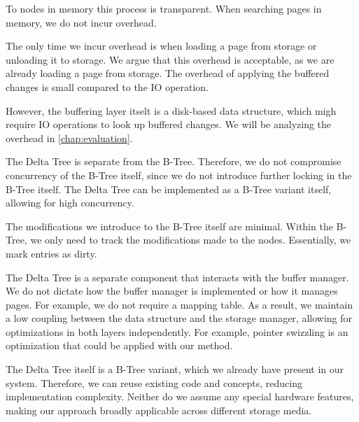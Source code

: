 To nodes in memory this process is transparent.
When searching pages in memory, we do not incur overhead.

The only time we incur overhead is when loading a page from storage or unloading it to storage.
We argue that this overhead is acceptable, as we are already loading a page from storage.
The overhead of applying the buffered changes is small compared to the \ac{IO} operation.

However, the buffering layer itselt is a disk-based data structure, which migh require \ac{IO} operations to look up buffered changes.
We will be analyzing the overhead in \autoref{chap:evaluation}.    %

The Delta Tree is separate from the B-Tree.
Therefore, we do not compromise concurrency of the B-Tree itself, since we do not introduce further locking in the B-Tree itself.
The Delta Tree can be implemented as a B-Tree variant itself, allowing for high concurrency.

The modifications we introduce to the B-Tree itself are minimal.
Within the B-Tree, we only need to track the modifications made to the nodes.
Essentially, we mark entries as dirty. 

The Delta Tree is a separate component that interacts with the buffer manager.
We do not dictate how the buffer manager is implemented or how it manages pages.
For example, we do not require a mapping table.
As a result, we maintain a low coupling between the data structure and the storage manager, allowing for optimizations in both layers independently.
For example, pointer swizzling is an optimization that could be applied with our method.

The Delta Tree itself is a B-Tree variant, which we already have present in our system.
Therefore, we can reuse existing code and concepts, reducing implementation complexity.
Neither do we assume any special hardware features, making our approach broadly applicable across different storage media.



